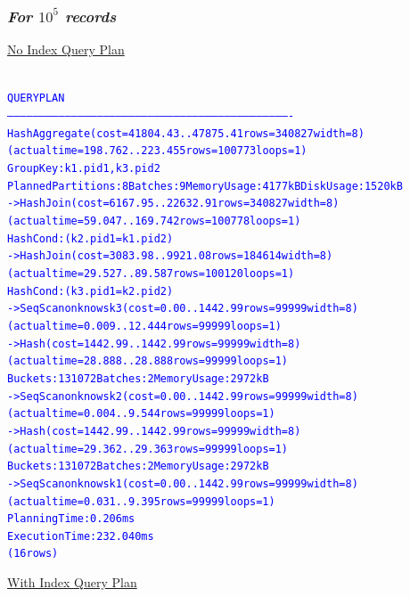 \documentclass{article}
\begin{document}
    \subsubsection*{\emph{For $10^5$ records}}
    \underline{No Index Query Plan}
    \begin{center}
      {\tiny
      \begin{alltt}
      \textcolor{blue}{
        QUERY PLAN                                                              
        -------------------------------------------------------------------------------------------------------------------------------------
         HashAggregate  (cost=41804.43..47875.41 rows=340827 width=8) (actual time=198.762..223.455 rows=100773 loops=1)
           Group Key: k1.pid1, k3.pid2
           Planned Partitions: 8  Batches: 9  Memory Usage: 4177kB  Disk Usage: 1520kB
           ->  Hash Join  (cost=6167.95..22632.91 rows=340827 width=8) (actual time=59.047..169.742 rows=100778 loops=1)
                 Hash Cond: (k2.pid1 = k1.pid2)
                 ->  Hash Join  (cost=3083.98..9921.08 rows=184614 width=8) (actual time=29.527..89.587 rows=100120 loops=1)
                       Hash Cond: (k3.pid1 = k2.pid2)
                       ->  Seq Scan on knows k3  (cost=0.00..1442.99 rows=99999 width=8) (actual time=0.009..12.444 rows=99999 loops=1)
                       ->  Hash  (cost=1442.99..1442.99 rows=99999 width=8) (actual time=28.888..28.888 rows=99999 loops=1)
                             Buckets: 131072  Batches: 2  Memory Usage: 2972kB
                             ->  Seq Scan on knows k2  (cost=0.00..1442.99 rows=99999 width=8) (actual time=0.004..9.544 rows=99999 loops=1)
                 ->  Hash  (cost=1442.99..1442.99 rows=99999 width=8) (actual time=29.362..29.363 rows=99999 loops=1)
                       Buckets: 131072  Batches: 2  Memory Usage: 2972kB
                       ->  Seq Scan on knows k1  (cost=0.00..1442.99 rows=99999 width=8) (actual time=0.031..9.395 rows=99999 loops=1)
         Planning Time: 0.206 ms
         Execution Time: 232.040 ms
        (16 rows)
       }
      \end{alltt}
      }
    \end{center}
    \underline{With Index Query Plan}
\end{document}
